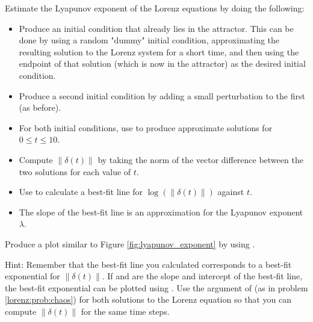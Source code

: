 \begin{problem}
Estimate the Lyapunov exponent of the Lorenz equations by doing the following:
\begin{itemize}
	\item Produce an initial condition that already lies in the attractor. This can be done by using a random "dummy" initial condition, approximating the resulting solution to the Lorenz system for a short time, and then using the endpoint of that solution (which is now in the attractor) as the desired initial condition.
	\item Produce a second initial condition by adding a small perturbation to the first (as before).
	\item For both initial conditions, use  to produce approximate solutions for $0 \leq t \leq 10$.
	\item Compute $\|\delta(t)\|$ by taking the norm of the vector difference between the two solutions for each value of $t$.
	\item Use  to calculate a best-fit line for $\log(\|\delta(t)\|)$ against $t$.
	\item The slope of the best-fit line is an approximation for the Lyapunov exponent $\lambda$.
	
\end{itemize}
Produce a plot similar to Figure \ref{fig:lyapunov_exponent} by using . 

Hint: Remember that the best-fit line you calculated corresponds to a best-fit exponential for $\|\delta(t)\|$. If  and  are the slope and intercept of the best-fit line, the best-fit exponential can be plotted using . Use the  argument of  (as in problem \ref{lorenz:prob:chaos}) for both solutions to the Lorenz equation so that you can compute $\|\delta(t)\|$ for the same time steps.
	

\end{problem}
